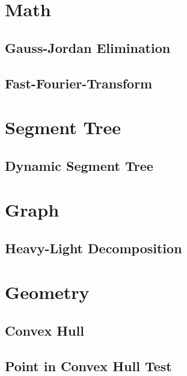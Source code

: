 \documentclass[10pt,landscape,a4paper,twocolumn]{article}
\begin{document}
\section{Math}

\subsection{Gauss-Jordan Elimination}


\subsection{Fast-Fourier-Transform}


\section{Segment Tree}

\subsection{Dynamic Segment Tree}


\section{Graph}

\subsection{Heavy-Light Decomposition}


\section{Geometry}

\subsection{Convex Hull}


\subsection{Point in Convex Hull Test}

\end{document}
